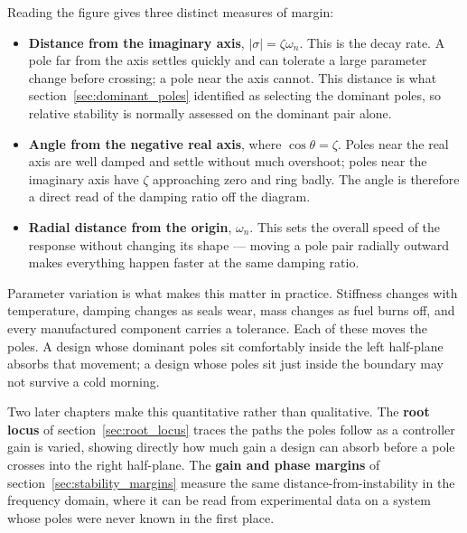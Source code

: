 \documentclass[12pt,letter]{article}
\begin{document}
Reading the figure gives three distinct measures of margin:

\begin{itemize}
	\item \textbf{Distance from the imaginary axis}, $|\sigma| = \zeta \omega_n$. This is the decay rate. A pole far from the axis settles quickly and can tolerate a large parameter change before crossing; a pole near the axis cannot. This distance is what section~\ref{sec:dominant_poles} identified as selecting the dominant poles, so relative stability is normally assessed on the dominant pair alone.
	\item \textbf{Angle from the negative real axis}, where $\cos \theta = \zeta$. Poles near the real axis are well damped and settle without much overshoot; poles near the imaginary axis have $\zeta$ approaching zero and ring badly. The angle is therefore a direct read of the damping ratio off the diagram.
	\item \textbf{Radial distance from the origin}, $\omega_n$. This sets the overall speed of the response without changing its shape --- moving a pole pair radially outward makes everything happen faster at the same damping ratio.
\end{itemize}

Parameter variation is what makes this matter in practice. Stiffness changes with temperature, damping changes as seals wear, mass changes as fuel burns off, and every manufactured component carries a tolerance. Each of these moves the poles. A design whose dominant poles sit comfortably inside the left half-plane absorbs that movement; a design whose poles sit just inside the boundary may not survive a cold morning.

Two later chapters make this quantitative rather than qualitative. The \textbf{root locus} of section~\ref{sec:root_locus} traces the paths the poles follow as a controller gain is varied, showing directly how much gain a design can absorb before a pole crosses into the right half-plane. The \textbf{gain and phase margins} of section~\ref{sec:stability_margins} measure the same distance-from-instability in the frequency domain, where it can be read from experimental data on a system whose poles were never known in the first place.
\end{document}
